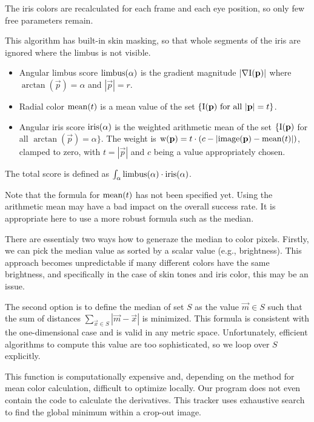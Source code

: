 The iris colors are recalculated for each frame and each eye position, so only few free parameters remain.

This algorithm has built-in skin masking, so that whole segments of the iris are ignored where the limbus is not visible.

\begin{itemize}
\item
Angular limbus score $\mathrm{limbus}(\alpha)$ is the gradient magnitude $|\nabla \mathrm{I}(\mathbf{p})|$ where $\arctan(\vec p) = \alpha$ and $|\vec p| = r$.

\item
Radial color $\mathrm{mean}(t)$ is a mean value of the set $\{\mathrm{I}(\mathbf{p}) \text{ for all } |\mathbf{p}| = t \}$.

\item
Angular iris score $\mathrm{iris}(\alpha)$ is the weighted arithmetic mean of the set $\{\mathrm{I}(\mathbf{p})$ for all $\arctan(\vec p) = \alpha \}$.
The weight is $\mathrm{w}(\mathbf{p}) = t \cdot (c - |\mathrm{image}(\mathbf{p}) - \mathrm{mean}(t)|)$, clamped to zero, with $t = |\vec p|$ and $c$ being a value appropriately chosen.

\end{itemize}
The total score is defined as $\int_\alpha \mathrm{limbus}(\alpha) \cdot \mathrm{iris}(\alpha)$.

Note that the formula for $\mathrm{mean}(t)$ has not been specified yet.
Using the arithmetic mean may have a bad impact on the overall success rate.
It is appropriate here to use a more robust formula such as the median.

There are essentialy two ways how to generaze the median to color pixels.
Firstly, we can pick the median value as sorted by a scalar value (e.g., brightness).
This approach becomes unpredictable if many different colors have the same brightness, and specifically in the case of skin tones and iris color, this may be an issue.

The second option is to define the median of set $S$ as the value $\vec m \in S$ such that the sum of distances $\sum_{\vec x \in S} |\vec m - \vec x|$ is minimized.
This formula is consistent with the one-dimensional case and is valid in any metric space.
Unfortunately, efficient algorithms to compute this value are too sophisticated, so we loop over $S$ explicitly.

This function is computationally expensive and, depending on the method for mean color calculation, difficult to optimize locally.
Our program does not even contain the code to calculate the derivatives.
This tracker uses exhaustive search to find the global minimum within a crop-out image.

